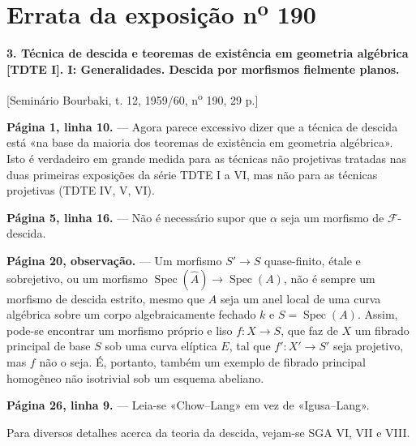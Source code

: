 \clearpage
\chapter*{Errata da exposição n\textsuperscript{o} 190}
\setcounter{footnote}{0}

\noindent\textbf{3. Técnica de descida e teoremas de existência em geometria
algébrica [TDTE I]. I: Generalidades. Descida por morfismos fielmente planos.}

\begin{center}
[Seminário Bourbaki, t. 12, 1959/60, n\textsuperscript{o} 190, 29 p.]
\end{center}

\noindent\textbf{Página 1, linha 10.} --- Agora parece excessivo dizer que a
técnica de descida está «na base da maioria dos teoremas de
existência em geometria algébrica». Isto é verdadeiro em grande medida para as
técnicas não projetivas tratadas nas duas primeiras exposições
da série TDTE I a VI, mas não para as técnicas projetivas (TDTE IV, V,
VI).

\noindent\textbf{Página 5, linha 16.} --- Não é necessário supor que $\alpha$
seja um morfismo de $\mathcal F$-descida.

\noindent\textbf{Página 20, observação.} --- Um morfismo
$S'\longrightarrow S$ quase-finito, étale e sobrejetivo, ou um morfismo
$\operatorname{Spec}(\widehat A)\longrightarrow\operatorname{Spec}(A)$, não é
sempre um morfismo de descida estrito, mesmo que $A$ seja um anel local de uma
curva algébrica sobre um corpo algebraicamente fechado $k$ e
$S=\operatorname{Spec}(A)$. Assim, pode-se encontrar um morfismo próprio e liso
$f:X\longrightarrow S$, que faz de $X$ um fibrado principal de base $S$ sob
uma curva elíptica $E$, tal que $f':X'\longrightarrow S'$ seja projetivo, mas
$f$ não o seja. É, portanto, também um exemplo de fibrado
principal homogêneo não isotrivial sob um esquema abeliano.

\noindent\textbf{Página 26, linha 9.} --- Leia-se «Chow--Lang» em vez de
«Igusa--Lang».

Para diversos detalhes acerca da teoria da descida, vejam-se SGA VI, VII e
VIII.
